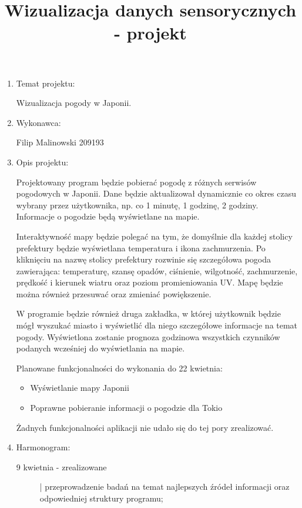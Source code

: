 \documentclass[a4paper]{article}
\title{Wizualizacja danych sensorycznych - projekt}
\date{}
\begin{document}
\maketitle

\begin{enumerate}

\item Temat projektu:

Wizualizacja pogody w Japonii.

\item Wykonawca:

Filip Malinowski 209193

\item Opis projektu:

Projektowany program będzie pobierać pogodę z różnych serwisów pogodowych w Japonii. Dane będzie aktualizował dynamicznie co okres czasu wybrany przez użytkownika, np. co 1 minutę, 1 godzinę, 2 godziny. Informacje o pogodzie będą wyświetlane na mapie.

Interaktywność mapy będzie polegać na tym, że domyślnie dla każdej stolicy prefektury będzie wyświetlana temperatura i ikona zachmurzenia. Po kliknięciu na nazwę stolicy prefektury rozwinie się szczegółowa pogoda zawierająca: temperaturę, szansę opadów, ciśnienie, wilgotność,  zachmurzenie, prędkość i kierunek wiatru oraz poziom promieniowania UV. Mapę będzie można również przesuwać oraz zmieniać powiększenie.

W programie będzie również druga zakładka, w której użytkownik będzie mógł wyszukać miasto i wyświetlić dla niego szczegółowe informacje na temat pogody. Wyświetlona zostanie prognoza godzinowa wszystkich czynników podanych wcześniej do wyświetlania na mapie.

Planowane funkcjonalności do wykonania do 22 kwietnia:
\begin{itemize}
\item Wyświetlanie mapy Japonii
\item Poprawne pobieranie informacji o pogodzie dla Tokio
\end{itemize}

Żadnych funkcjonalności aplikacji nie udało się do tej pory zrealizować.

\item Harmonogram:

\begin{description}
\item[9 kwietnia - zrealizowane] | przeprowadzenie badań na temat najlepszych źródeł informacji oraz odpowiedniej struktury programu;


\end{description}
\end{enumerate}
\end{document}
